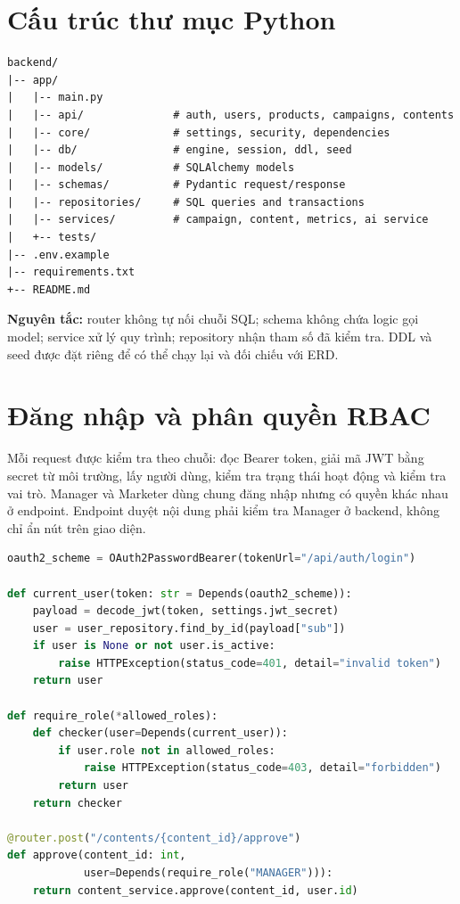 \section{Cấu trúc thư mục Python}

\begin{lstlisting}[language={},caption={Cấu trúc mã nguồn đề xuất}]
backend/
|-- app/
|   |-- main.py
|   |-- api/              # auth, users, products, campaigns, contents
|   |-- core/             # settings, security, dependencies
|   |-- db/               # engine, session, ddl, seed
|   |-- models/           # SQLAlchemy models
|   |-- schemas/          # Pydantic request/response
|   |-- repositories/     # SQL queries and transactions
|   |-- services/         # campaign, content, metrics, ai service
|   +-- tests/
|-- .env.example
|-- requirements.txt
+-- README.md
\end{lstlisting}

\noindent\textbf{Nguyên tắc:} router không tự nối chuỗi SQL; schema không chứa logic gọi model; service xử lý quy trình; repository nhận tham số đã kiểm tra. DDL và seed được đặt riêng để có thể chạy lại và đối chiếu với ERD.

\section{Đăng nhập và phân quyền RBAC}

Mỗi request được kiểm tra theo chuỗi: đọc Bearer token, giải mã JWT bằng secret từ môi trường, lấy người dùng, kiểm tra trạng thái hoạt động và kiểm tra vai trò. Manager và Marketer dùng chung đăng nhập nhưng có quyền khác nhau ở endpoint. Endpoint duyệt nội dung phải kiểm tra Manager ở backend, không chỉ ẩn nút trên giao diện.

\begin{lstlisting}[language=Python,caption={Dependency kiểm tra JWT và vai trò}]
oauth2_scheme = OAuth2PasswordBearer(tokenUrl="/api/auth/login")

def current_user(token: str = Depends(oauth2_scheme)):
    payload = decode_jwt(token, settings.jwt_secret)
    user = user_repository.find_by_id(payload["sub"])
    if user is None or not user.is_active:
        raise HTTPException(status_code=401, detail="invalid token")
    return user

def require_role(*allowed_roles):
    def checker(user=Depends(current_user)):
        if user.role not in allowed_roles:
            raise HTTPException(status_code=403, detail="forbidden")
        return user
    return checker

@router.post("/contents/{content_id}/approve")
def approve(content_id: int,
            user=Depends(require_role("MANAGER"))):
    return content_service.approve(content_id, user.id)
\end{lstlisting}

